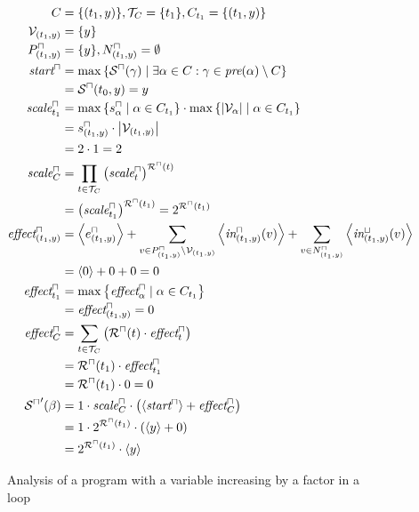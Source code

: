 \begin{figure}
\begin{align*}
  C &= \lbrace (t_1,y) \rbrace, \mathcal{T}_C = \lbrace t_1 \rbrace, C_{t_1} = \lbrace (t_1,y) \rbrace \\
  \mathcal{V}_{(t_1,y)} &= \lbrace y \rbrace \\
  P^\sqcap_{(t_1,y)} &= \lbrace y \rbrace, N^\sqcap_{(t_1,y)} = \emptyset \\
  \emph{start}^\sqcap &= \max \left\lbrace {\mathcal{S}^\sqcap}(\gamma) \mid \exists \alpha \in C: \gamma \in \emph{pre}(\alpha) \setminus C \right\rbrace \\
  &= {\mathcal{S}^\sqcap}(t_0,y) = y \\
  \emph{scale}^\sqcap_{t_1} &= \max \left\lbrace s^\sqcap_\alpha \mid \alpha \in C_{t_1} \right\rbrace \cdot \max \left\lbrace \left|\mathcal{V}_\alpha\right| \mid \alpha \in C_{t_1} \right\rbrace \\
  &= s^\sqcap_{(t_1,y)} \cdot \left|\mathcal{V}_{(t_1,y)}\right| \\
  &= 2 \cdot 1 = 2 \\
  \emph{scale}^\sqcap_C &= \prod_{t \in \mathcal{T}_C} \left( \emph{scale}^\sqcap_t \right) ^{{\mathcal{R}^\sqcap}(t)} \\
  &= \left( \emph{scale}^\sqcap_{t_1} \right) ^{{\mathcal{R}^\sqcap}(t_1)} = 2^{{\mathcal{R}^\sqcap}(t_1)} \\
  \emph{effect}^\sqcap_{(t_1,y)} &= \left\langle e^{\sqcap}_{(t_1,y)} \right\rangle + \sum_{v \in P_{(t_1,y)}^\sqcap \setminus \mathcal{V}_{(t_1,y)}} \left\langle \emph{in}^\sqcap_{(t_1,y)}(v) \right\rangle + \sum_{v \in N_{(t_1,y)}^\sqcap} \left\langle \emph{in}^\sqcup_{(t_1,y)}(v) \right\rangle \\
  &= \left\langle 0 \right\rangle + 0 + 0 = 0 \\
  \emph{effect}^\sqcap_{t_1} &= \max \left\lbrace \emph{effect}^\sqcap_\alpha \mid \alpha \in C_{t_1}  \right\rbrace \\
  &= \emph{effect}^\sqcap_{(t_1,y)} = 0 \\
  \emph{effect}^\sqcap_C &= \sum_{t \in \mathcal{T}_C} \left( {\mathcal{R}^\sqcap}(t) \cdot \emph{effect}^\sqcap_t \right) \\
  &= {\mathcal{R}^\sqcap}(t_1) \cdot \emph{effect}^\sqcap_{t_1} \\
  &= {\mathcal{R}^\sqcap}(t_1) \cdot 0 = 0 \\
  {\mathcal{S}^\sqcap}'(\beta) &= 1 \cdot \emph{scale}^\sqcap_C \cdot \left( \left\langle \emph{start}^\sqcap \right\rangle + \emph{effect}^\sqcap_C \right) \\
  &= 1 \cdot 2^{{\mathcal{R}^\sqcap}(t_1)} \cdot \left( \left\langle y \right\rangle + 0 \right) \\
  &= 2^{{\mathcal{R}^\sqcap}(t_1)} \cdot \left\langle y \right\rangle
\end{align*}

\caption{Analysis of a program with a variable increasing by a factor in a loop}
\label{fig:nontrivial_nodependency}
\end{figure}
